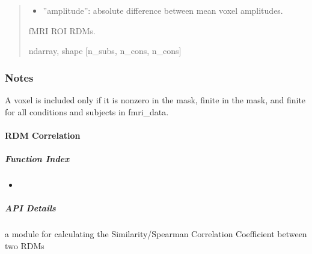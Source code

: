 \documentclass[letterpaper,10pt,english]{sphinxhowto}
\begin{document}
\begin{fulllineitems}
\begin{quote}
\begin{description}
\begin{itemize}
\begin{itemize}
\item {} 
\sphinxAtStartPar
”amplitude”: absolute difference between mean voxel amplitudes.

\end{itemize}


\end{itemize}

\sphinxAtStartPar
{} \textendash{} fMRI ROI RDMs.

\sphinxAtStartPar
ndarray, shape {[}n\_subs, n\_cons, n\_cons{]}

\end{description}\end{quote}
\subsubsection*{Notes}

\sphinxAtStartPar
A voxel is included only if it is non\sphinxhyphen{}zero in the mask, finite in the mask,
and finite for all conditions and subjects in fmri\_data.

\end{fulllineitems}


\sphinxstepscope

\clearpage


\paragraph{RDM Correlation}
\label{\detokenize{rdm_corr:rdm-correlation}}\label{\detokenize{rdm_corr::doc}}
\sphinxAtStartPar
{}


\subparagraph{Function Index}
\label{\detokenize{rdm_corr:function-index}}\begin{itemize}
\item {} 
\sphinxAtStartPar
{}

\end{itemize}


\subparagraph{API Details}
\label{\detokenize{rdm_corr:module-neurora.rdm_corr}}\label{\detokenize{rdm_corr:api-details}}
\sphinxAtStartPar
a module for calculating the Similarity/Spearman Correlation Coefficient between two RDMs
\end{document}
